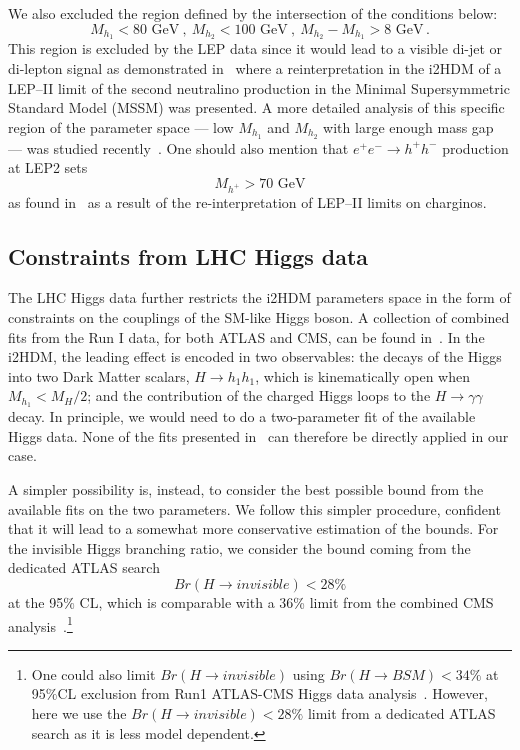 \documentclass[12pt,a4paper]{article}
\begin{document}
We also excluded the region defined by the intersection of the conditions below:
\begin{equation}
M_{h_1}<80\mbox{ GeV} \ , \ M_{h_2}<100\mbox{ GeV} \ ,  \ M_{h_2}-M_{h_1}>8 \mbox{ GeV}\,.
\label{eq:dmh12}
\end{equation}
This region is excluded by the LEP data since it would lead to a visible
di-jet or di-lepton signal as demonstrated in~\cite{Lundstrom:2008ai}
where a reinterpretation in the i2HDM of a LEP--II limit of the second neutralino production in the Minimal Supersymmetric Standard Model (MSSM) was presented.
A more detailed analysis of this specific region of the parameter space ---
low $M_{h_1}$ and $M_{h_2}$ with large enough mass gap --- was studied recently~\cite{Belanger:2015kga}.
One should also mention that  $e^+e^-\to h^+h^-$ production at LEP2
sets
\begin{equation}
M_{h^+}>70\mbox{ GeV}
\label{eq:mhcp-lep2}
\end{equation}
as found in~\cite{Pierce:2007ut} as a result of the re-interpretation of LEP--II limits on charginos.



%
\subsection{Constraints from LHC Higgs data}

The LHC Higgs data further restricts the i2HDM parameters space in the form of constraints on the couplings of the SM-like Higgs boson. A collection of combined fits from the Run I data, for both ATLAS and CMS, can be found in~\cite{Khachatryan:2016vau}.
In the i2HDM, the leading effect is encoded in two observables: the decays of the Higgs into two Dark Matter scalars, $H \to h_1 h_1$, which is kinematically open when $M_{h_1} < M_H/2$; and the contribution of the charged Higgs loops to the $H \to \gamma \gamma$ decay. 
In principle, we would need to do a two-parameter fit of the available Higgs data.  None of the fits presented in~\cite{Khachatryan:2016vau} can therefore be directly applied in our case.

A simpler possibility is, instead, to consider the best possible bound from the available fits on the two parameters.
We follow this simpler procedure, confident that it will lead to a somewhat more conservative estimation of the bounds.
For the invisible Higgs branching ratio, we consider the bound coming from the dedicated ATLAS search~\cite{Aad:2015txa}
\begin{equation}
Br(H\to invisible)  < 28\% 
\label{eq:lhc-higgs-invis}
\end{equation}
at the 95$\%$ CL, which is comparable with a 36\% limit
from the combined CMS analysis~\cite{CMS:2015naa}.\footnote{One could also limit $Br(H\to invisible)$ 
using $Br(H\to BSM)<34\% $ at 95$\%$CL exclusion from Run1  ATLAS-CMS Higgs data analysis~\cite{Khachatryan:2016vau}.
However, here we use the $Br(H\to invisible) < 28\% $ limit from a dedicated ATLAS search
as it is less model dependent.}
\end{document}
